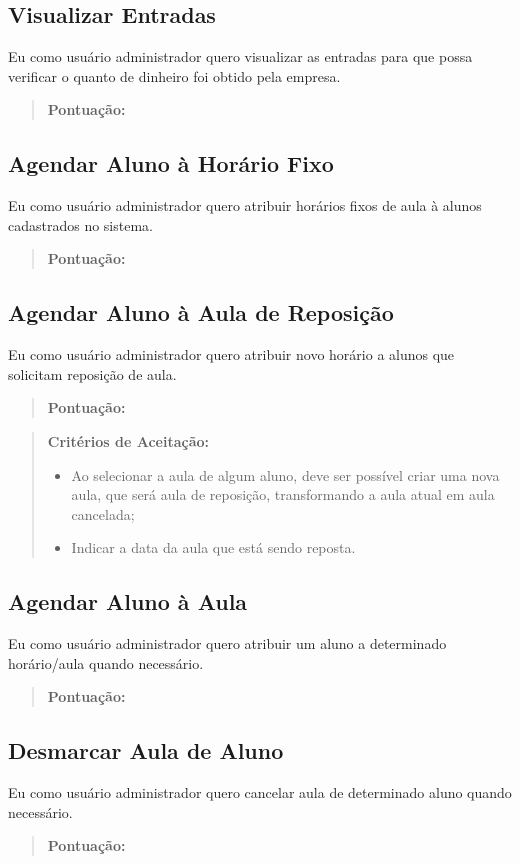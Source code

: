 \subsection[Visualizar Entradas]{Visualizar Entradas}
Eu como usuário administrador quero visualizar as entradas para que possa
verificar o quanto de dinheiro foi obtido pela empresa.
\begin{quote}
    \textbf{Pontuação:}
\end{quote}

\subsection[Agendar Aluno à Horário Fixo]{Agendar Aluno à Horário Fixo}
Eu como usuário administrador quero atribuir horários fixos de aula à alunos
cadastrados no sistema.
\begin{quote}
    \textbf{Pontuação:}
\end{quote}

\subsection[Agendar Aluno à Aula de Reposição]{Agendar Aluno à Aula de Reposição}
Eu como usuário administrador quero atribuir novo horário a alunos que solicitam
reposição de aula.
\begin{quote}
    \textbf{Pontuação:}
\end{quote}
\begin{quote}
\textbf{Critérios de Aceitação:}
    \begin{itemize}
        \item Ao selecionar a aula de algum aluno, deve ser possível criar uma nova aula,
        que será aula de reposição, transformando a aula atual em aula cancelada;
        \item Indicar a data da aula que está sendo reposta.
    \end{itemize}
\end{quote}

\subsection[Agendar Aluno à Aula]{Agendar Aluno à Aula}
Eu como usuário administrador quero atribuir um aluno a determinado
horário/aula quando necessário.
\begin{quote}
    \textbf{Pontuação:}
\end{quote}

\subsection[Desmarcar Aula de Aluno]{Desmarcar Aula de Aluno}
Eu como usuário administrador quero cancelar aula de determinado aluno quando
necessário.
\begin{quote}
    \textbf{Pontuação:}
\end{quote}

